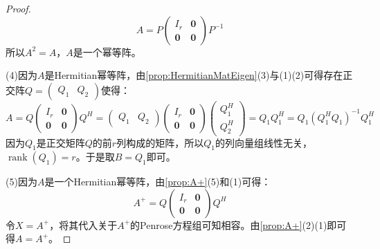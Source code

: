 \begin{proof}
	\begin{equation*}
		A=P
		\begin{pmatrix}
			I_r & \mathbf{0} \\
			\mathbf{0} & \mathbf{0}
		\end{pmatrix}P^{-1}
	\end{equation*}
	所以$A^2=A$，$A$是一个幂等阵。\par
	(4)因为$A$是Hermitian幂等阵，由\cref{prop:HermitianMatEigen}(3)与(1)(2)可得存在正交阵$Q=\begin{pmatrix}
		Q_1 & Q_2
	\end{pmatrix}$使得：
	\begin{equation*}
		A=Q\begin{pmatrix}
			I_r & \mathbf{0} \\
			\mathbf{0} & \mathbf{0}
		\end{pmatrix}Q^H=
		\begin{pmatrix}
			Q_1 & Q_2
		\end{pmatrix}
		\begin{pmatrix}
			I_r & \mathbf{0} \\
			\mathbf{0} & \mathbf{0}
		\end{pmatrix}
		\begin{pmatrix}
			Q_1^H \\
			Q_2^H
		\end{pmatrix}
		=Q_1Q_1^H=Q_1(Q_1^HQ_1)^{-1}Q_1^H
	\end{equation*}
	因为$Q_1$是正交矩阵$Q$的前$r$列构成的矩阵，所以$Q_1$的列向量组线性无关，$\operatorname{rank}(Q_1)=r$。于是取$B=Q_1$即可。\par
	(5)因为$A$是一个Hermitian幂等阵，由\cref{prop:A+}(5)和(1)可得：
	\begin{equation*}
		A^+=Q
		\begin{pmatrix}
			I_r & \mathbf{0} \\
			\mathbf{0} & \mathbf{0}
		\end{pmatrix}Q^H
	\end{equation*}
	令$X=A^+$，将其代入关于$A^+$的Penrose方程组可知相容。由\cref{prop:A+}(2)(1)即可得$A=A^+$。
\end{proof}

